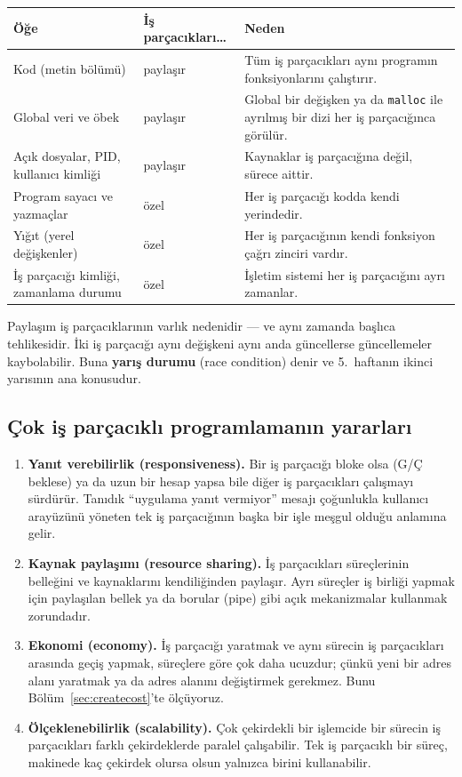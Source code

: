\documentclass[11pt,a4paper]{article}
\newcommand{\term}[1]{\textbf{\color{mintdeep}#1}}
\newcommand{\cmd}[1]{\texttt{#1}}
\begin{document}
\begin{center}
\renewcommand{\arraystretch}{1.3}
\begin{tabularx}{\linewidth}{>{\raggedright\arraybackslash}p{4.4cm} l >{\raggedright\arraybackslash}X}
\toprule
\textbf{Öğe} & \textbf{İş parçacıkları\dots} & \textbf{Neden} \\
\midrule
Kod (metin bölümü) & paylaşır & Tüm iş parçacıkları aynı programın fonksiyonlarını çalıştırır. \\
Global veri ve öbek & paylaşır & Global bir değişken ya da \cmd{malloc} ile ayrılmış bir dizi her iş parçacığınca görülür. \\
Açık dosyalar, PID, kullanıcı kimliği & paylaşır & Kaynaklar iş parçacığına değil, sürece aittir. \\
Program sayacı ve yazmaçlar & özel & Her iş parçacığı kodda kendi yerindedir. \\
Yığıt (yerel değişkenler) & özel & Her iş parçacığının kendi fonksiyon çağrı zinciri vardır. \\
İş parçacığı kimliği, zamanlama durumu & özel & İşletim sistemi her iş parçacığını ayrı zamanlar. \\
\bottomrule
\end{tabularx}
\end{center}

Paylaşım iş parçacıklarının varlık nedenidir --- ve aynı zamanda başlıca tehlikesidir. İki iş parçacığı aynı değişkeni aynı anda güncellerse güncellemeler kaybolabilir. Buna \term{yarış durumu} (race condition) denir ve 5.~haftanın ikinci yarısının ana konusudur.

\subsection{Çok iş parçacıklı programlamanın yararları}

\begin{enumerate}[leftmargin=1.4em]
  \item \textbf{Yanıt verebilirlik (responsiveness).} Bir iş parçacığı bloke olsa (G/Ç beklese) ya da uzun bir hesap yapsa bile diğer iş parçacıkları çalışmayı sürdürür. Tanıdık ``uygulama yanıt vermiyor'' mesajı çoğunlukla kullanıcı arayüzünü yöneten tek iş parçacığının başka bir işle meşgul olduğu anlamına gelir.
  \item \textbf{Kaynak paylaşımı (resource sharing).} İş parçacıkları süreçlerinin belleğini ve kaynaklarını kendiliğinden paylaşır. Ayrı süreçler iş birliği yapmak için paylaşılan bellek ya da borular (pipe) gibi açık mekanizmalar kullanmak zorundadır.
  \item \textbf{Ekonomi (economy).} İş parçacığı yaratmak ve aynı sürecin iş parçacıkları arasında geçiş yapmak, süreçlere göre çok daha ucuzdur; çünkü yeni bir adres alanı yaratmak ya da adres alanını değiştirmek gerekmez. Bunu Bölüm~\ref{sec:createcost}'te ölçüyoruz.
  \item \textbf{Ölçeklenebilirlik (scalability).} Çok çekirdekli bir işlemcide bir sürecin iş parçacıkları farklı çekirdeklerde paralel çalışabilir. Tek iş parçacıklı bir süreç, makinede kaç çekirdek olursa olsun yalnızca birini kullanabilir.
\end{enumerate}
\end{document}
